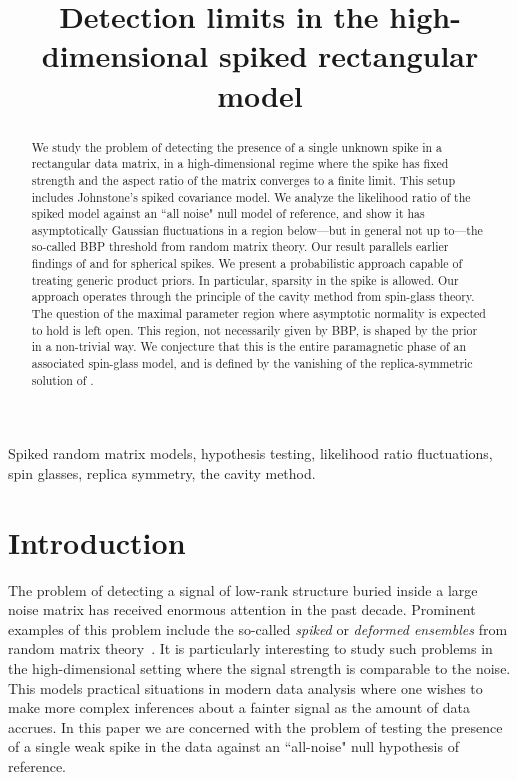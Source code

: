 \documentclass[final,12pt]{colt2018} %
\title[Detection limits in spiked models]{Detection limits in the high-dimensional spiked rectangular model}
\begin{document}
\maketitle
\begin{abstract}
We study the problem of detecting the presence of a single unknown spike in a rectangular data matrix, in a high-dimensional regime where the spike has fixed strength and the aspect ratio of the matrix converges to a finite limit. This setup includes Johnstone's spiked covariance model. We analyze the likelihood ratio of the spiked model against an ``all noise" null model of reference, and show it has asymptotically Gaussian fluctuations in a region below---but in general not up to---the so-called BBP threshold from random matrix theory. Our result parallels earlier findings of \cite{onatski2013asymptotic} and \cite{johnstone2015testing} for spherical spikes. We present a probabilistic approach capable of treating generic product priors. In particular, sparsity in the spike is allowed. Our approach operates through the principle of the cavity method from spin-glass theory.  The question of the maximal parameter region where asymptotic normality is expected to hold is left open. This region, not necessarily given by BBP, is shaped by the prior in a non-trivial way. We conjecture that this is the entire paramagnetic phase of an associated spin-glass model, and is defined by the vanishing of the replica-symmetric solution of \cite{lesieur2015mmse}.        
\end{abstract}

 
\begin{keywords}
Spiked random matrix models, hypothesis testing, likelihood ratio fluctuations, spin glasses, replica symmetry, the cavity method. 
\end{keywords}

\section{Introduction}
The problem of detecting a signal of low-rank structure buried inside a large noise matrix has received enormous attention in the past decade. 
Prominent examples of this problem include the so-called \emph{spiked} or \emph{deformed ensembles} from random matrix theory~\citep{peche2014ICM}. It is particularly interesting to study such problems in the high-dimensional setting where the signal strength is comparable to the noise. This models practical situations in modern data analysis where one wishes to make more complex inferences about a fainter signal as the amount of data accrues.  In this paper we are concerned with the problem of testing the presence of a single weak spike in the data against an ``all-noise" null hypothesis of reference. 
\end{document}
